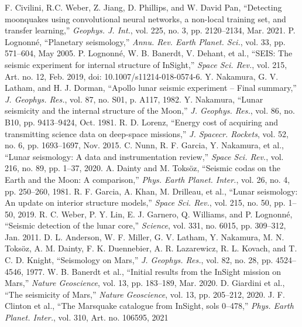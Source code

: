 \documentclass[conference]{IEEEtran}
\begin{document}
\begin{thebibliography}{00}
     F. Civilini, R.C. Weber, Z. Jiang, D. Phillips, and W. David Pan, ``Detecting moonquakes using convolutional neural networks, a non-local training set, and transfer learning,'' \emph{Geophys. J. Int.}, vol. 225, no. 3, pp. 2120--2134, Mar. 2021.
      P. Lognonné, ``Planetary seismology,'' \emph{Annu. Rev. Earth Planet. Sci.}, vol. 33, pp. 571--604, May 2005.
     P. Lognonné, W. B. Banerdt, V. Dehant, et al., ``SEIS: The seismic experiment for internal structure of InSight,'' \emph{Space Sci. Rev.}, vol. 215, Art. no. 12, Feb. 2019, doi: 10.1007/s11214-018-0574-6.
     Y. Nakamura, G. V. Latham, and H. J. Dorman, ``Apollo lunar seismic experiment – Final summary,'' \emph{J. Geophys. Res.}, vol. 87, no. S01, p. A117, 1982.
     Y. Nakamura, ``Lunar seismicity and the internal structure of the Moon,'' \emph{J. Geophys. Res.}, vol. 86, no. B10, pp. 9413--9424, Oct. 1981.
     R. D. Lorenz, ``Energy cost of acquiring and transmitting science data on deep-space missions,'' \emph{J. Spacecr. Rockets}, vol. 52, no. 6, pp. 1693--1697, Nov. 2015.
     C. Nunn, R. F. Garcia, Y. Nakamura, et al., ``Lunar seismology: A data and instrumentation review,'' \emph{Space Sci. Rev.}, vol. 216, no. 89, pp. 1--37, 2020.
     A. Dainty and M. Toksöz, ``Seismic codas on the Earth and the Moon: A comparison,'' \emph{Phys. Earth Planet. Inter.}, vol. 26, no. 4, pp. 250--260, 1981.
     R. F. Garcia, A. Khan, M. Drilleau, et al., ``Lunar seismology: An update on interior structure models,'' \emph{Space Sci. Rev.}, vol. 215, no. 50, pp. 1--50, 2019.
     R. C. Weber, P. Y. Lin, E. J. Garnero, Q. Williams, and P. Lognonné, ``Seismic detection of the lunar core,'' \emph{Science}, vol. 331, no. 6015, pp. 309--312, Jan. 2011.
     D. L. Anderson, W. F. Miller, G. V. Latham, Y. Nakamura, M. N. Toksöz, A. M. Dainty, F. K. Duennebier, A. R. Lazarewicz, R. L. Kovach, and T. C. D. Knight, ``Seismology on Mars,'' \emph{J. Geophys. Res.}, vol. 82, no. 28, pp. 4524--4546, 1977.
     W. B. Banerdt et al., ``Initial results from the InSight mission on Mars,'' \emph{Nature Geoscience}, vol. 13, pp. 183--189, Mar. 2020.
     D. Giardini et al., ``The seismicity of Mars,'' \emph{Nature Geoscience}, vol. 13, pp. 205--212, 2020.
     J. F. Clinton et al., ``The Marsquake catalogue from InSight, sols 0--478,'' \emph{Phys. Earth Planet. Inter.}, vol. 310, Art. no. 106595, 2021

\end{thebibliography}
\end{document}
